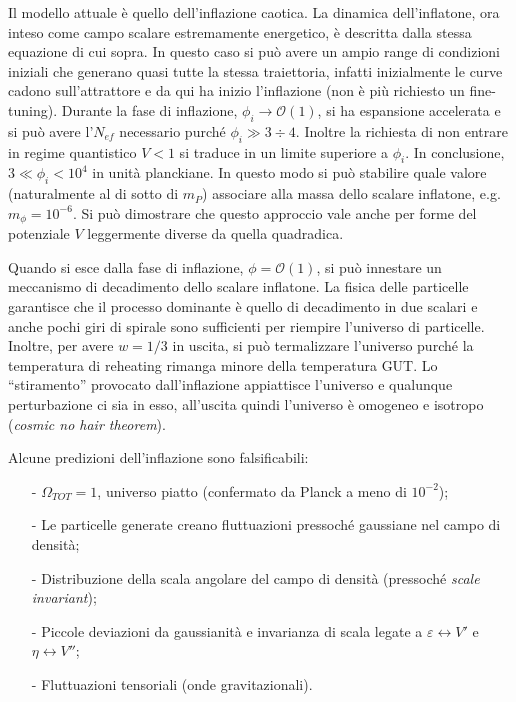 Il modello attuale è quello dell'inflazione caotica. La dinamica dell'inflatone, ora inteso come campo scalare estremamente energetico, è descritta dalla stessa equazione di cui sopra. In questo caso si può avere un ampio range di condizioni iniziali che generano quasi tutte la stessa traiettoria, infatti inizialmente le curve cadono sull'attrattore e da qui ha inizio l'inflazione (non è più richiesto un fine-tuning). Durante la fase di inflazione, $\phi_i \rightarrow \mathcal{O}(1)$, si ha espansione accelerata e si può avere l'$N_{ef}$ necessario purché $\phi_i \gg 3\div 4$. Inoltre la richiesta di non entrare in regime quantistico $V<1$ si traduce in un limite superiore a $\phi_i$. In conclusione, $ 3 \ll \phi_i < 10^4$ in unità planckiane. In questo modo si può stabilire quale valore (naturalmente al di sotto di $m_P$) associare alla massa dello scalare inflatone, e.g. $m_\phi = 10^{-6}$. Si può dimostrare che questo approccio vale anche per forme del potenziale $V$ leggermente diverse da quella quadradica. 

Quando si esce dalla fase di inflazione, $\phi = \mathcal{O}(1)$, si può innestare un meccanismo di decadimento dello scalare inflatone. La fisica delle particelle garantisce che il processo dominante è quello di decadimento in due scalari e anche pochi giri di spirale sono sufficienti per riempire l'universo di particelle. Inoltre, per avere $w=1/3$ in uscita, si può termalizzare l'universo purché la temperatura di reheating rimanga minore della temperatura GUT. Lo ``stiramento'' provocato dall'inflazione appiattisce l'universo e qualunque perturbazione ci sia in esso, all'uscita quindi l'universo è omogeneo e isotropo (\textit{cosmic no hair theorem}).

\vspace{1em}
\noindent Alcune predizioni dell'inflazione sono falsificabili: 
\begin{itemize}
    \item[-] $\Omega_{TOT} = 1$, universo piatto (confermato da Planck a meno di $10^{-2}$);
    \item[-] Le particelle generate creano fluttuazioni pressoché gaussiane nel campo di densità;
    \item[-] Distribuzione della scala angolare del campo di densità (pressoché \textit{scale invariant});
    \item[-] Piccole deviazioni da gaussianità e invarianza di scala legate a $\varepsilon \leftrightarrow  V' $ e $\eta \leftrightarrow V''$;
    \item[-] Fluttuazioni tensoriali (onde gravitazionali).
\end{itemize}

